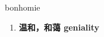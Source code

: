 
\begin{frame}
{\huge bonhomie}
\begin{center}
\begin{enumerate}\Large
  \item \textbf{温和，和蔼 geniality}
\end{enumerate}
\end{center}
\end{frame}
